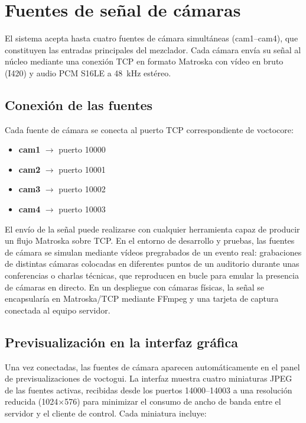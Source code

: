 \section{Fuentes de señal de cámaras}
\label{sec:fuentes_camaras}

El sistema acepta hasta cuatro fuentes de cámara simultáneas (cam1--cam4), que
constituyen las entradas principales del mezclador. Cada cámara envía su señal al
núcleo mediante una conexión TCP en formato Matroska con vídeo en bruto (I420) y audio
PCM S16LE a 48~kHz estéreo.

\subsection{Conexión de las fuentes}

Cada fuente de cámara se conecta al puerto TCP correspondiente de voctocore:

\begin{itemize}
  \item \textbf{cam1} $\rightarrow$ puerto 10000
  \item \textbf{cam2} $\rightarrow$ puerto 10001
  \item \textbf{cam3} $\rightarrow$ puerto 10002
  \item \textbf{cam4} $\rightarrow$ puerto 10003
\end{itemize}

El envío de la señal puede realizarse con cualquier herramienta capaz de producir un
flujo Matroska sobre TCP. En el entorno de desarrollo y pruebas, las fuentes de cámara
se simulan mediante vídeos pregrabados de un evento real: grabaciones de distintas
cámaras colocadas en diferentes puntos de un auditorio durante unas conferencias o
charlas técnicas, que reproducen en bucle para emular la presencia de cámaras en
directo. En un despliegue con cámaras físicas, la señal se encapsularía en
Matroska/TCP mediante FFmpeg y una tarjeta de captura conectada al equipo servidor.

\subsection{Previsualización en la interfaz gráfica}

Una vez conectadas, las fuentes de cámara aparecen automáticamente en el panel de
previsualizaciones de voctogui. La interfaz muestra cuatro miniaturas JPEG de las
fuentes activas, recibidas desde los puertos 14000--14003 a una resolución reducida
(1024×576) para minimizar el consumo de ancho de banda entre el servidor y el cliente
de control. Cada miniatura incluye:

